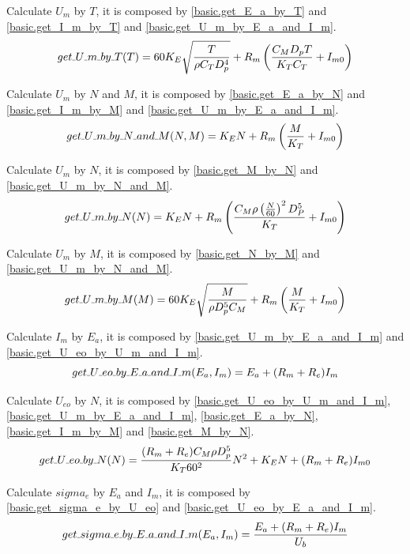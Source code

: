 \documentclass{article} %
\numberwithin{equation}{section} %
\newcommand{\SL}{\rule{.3em}{.3pt}} %
\begin{document}
Calculate $U_m$ by $T$, it is composed by \eqref{basic.get_E_a_by_T} and \eqref{basic.get_I_m_by_T} and \eqref{basic.get_U_m_by_E_a_and_I_m}.
\begin{equation}
get\SL U\SL m\SL by\SL T (T) = {60} K_E \sqrt{\frac{T}{\rho C_T D_p^4}} 
	+ R_m \left(\frac{C_M D_p T}{K_T C_T} + I_{m0}\right) \label{basic.get_U_m_by_T}
\end{equation}

Calculate $U_m$ by $N$ and $M$, it is composed by \eqref{basic.get_E_a_by_N} and \eqref{basic.get_I_m_by_M} and \eqref{basic.get_U_m_by_E_a_and_I_m}.
\begin{equation}
get\SL U\SL m\SL by\SL N\SL and\SL M (N, M) = K_E N 
	+ R_m \left(\frac{M}{K_T} + I_{m0}\right) 
	\label{basic.get_U_m_by_N_and_M}
\end{equation}

Calculate $U_m$ by $N$, it is composed by \eqref{basic.get_M_by_N} and \eqref{basic.get_U_m_by_N_and_M}.
\begin{equation} \label{basic.get_U_m_by_N}
get\SL U\SL m\SL by\SL N (N) = K_E N + R_m \left(\frac{ C_M\rho \left(\frac N {60} \right)^2 D_P^5 }{K_T} + I_{m0}\right)
\end{equation}

Calculate $U_m$ by $M$, it is composed by \eqref{basic.get_N_by_M} and \eqref{basic.get_U_m_by_N_and_M}.
\begin{equation}
get\SL U\SL m\SL by\SL M (M) = 60  K_E \sqrt{\frac{M}{\rho D_p^5 C_M}} 
	+ R_m \left(\frac{M}{K_T} + I_{m0}\right) 
	\label{basic.get_U_m_by_M}
\end{equation}

Calculate $I_m$ by $E_a$, it is composed by \eqref{basic.get_U_m_by_E_a_and_I_m} and \eqref{basic.get_U_eo_by_U_m_and_I_m}.
\begin{equation}
get\SL U\SL eo\SL by\SL E\SL a\SL and\SL I\SL m (E_a, I_m) = E_a + (R_m + R_e) I_m \label{basic.get_U_eo_by_E_a_and_I_m}
\end{equation}

Calculate $U_{eo}$ by $N$, it is composed by \eqref{basic.get_U_eo_by_U_m_and_I_m}, 
   \eqref{basic.get_U_m_by_E_a_and_I_m}, 
   \eqref{basic.get_E_a_by_N}, 
   \eqref{basic.get_I_m_by_M} and
   \eqref{basic.get_M_by_N}.
\begin{equation}
get\SL U\SL eo\SL by\SL N (N) = \frac{(R_m + R_e) C_M \rho D_p^5}{K_T 60^{2}} N^2
	+ K_E N + (R_m + R_e) I_{m0}
\end{equation}

Calculate $sigma_e$ by $E_a$ and $I_m$, it is composed by \eqref{basic.get_sigma_e_by_U_eo} and \eqref{basic.get_U_eo_by_E_a_and_I_m}.
\begin{equation}
get\SL sigma\SL e\SL by\SL E\SL a\SL and\SL I\SL m (E_a, I_m) = \frac{E_a + (R_m + R_e) I_m}{U_b} \label{basic.get_sigma_e_by_E_a_and_I_m}
\end{equation}
\end{document}
